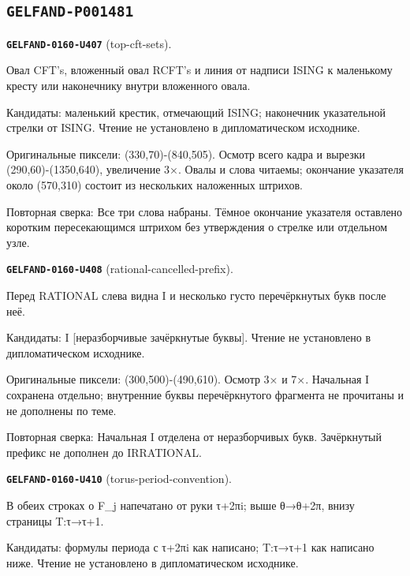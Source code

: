 \subsection*{\texttt{GELFAND-P001481}}
\par\noindent\leavevmode{}\label{GELFAND-0160-U407}\label{GELFAND-P001481:top-cft-sets}\textbf{\texttt{GELFAND-0160-U407}} (top-cft-sets).\nopagebreak[4]\par
Овал CFT's, вложенный овал RCFT's и линия от надписи ISING к маленькому кресту или наконечнику внутри вложенного овала.\par
Кандидаты: маленький крестик, отмечающий ISING; наконечник указательной стрелки от ISING. Чтение не установлено в дипломатическом исходнике.\par
Оригинальные пиксели: (330,70)-(840,505). Осмотр всего кадра и вырезки (290,60)-(1350,640), увеличение 3×. Овалы и слова читаемы; окончание указателя около (570,310) состоит из нескольких наложенных штрихов.\par
Повторная сверка: Все три слова набраны. Тёмное окончание указателя оставлено коротким пересекающимся штрихом без утверждения о стрелке или отдельном узле.\par\medskip
\par\noindent\leavevmode{}\label{GELFAND-0160-U408}\label{GELFAND-P001481:rational-cancelled-prefix}\textbf{\texttt{GELFAND-0160-U408}} (rational-cancelled-prefix).\nopagebreak[4]\par
Перед RATIONAL слева видна I и несколько густо перечёркнутых букв после неё.\par
Кандидаты: I [неразборчивые зачёркнутые буквы]. Чтение не установлено в дипломатическом исходнике.\par
Оригинальные пиксели: (300,500)-(490,610). Осмотр 3× и 7×. Начальная I сохранена отдельно; внутренние буквы перечёркнутого фрагмента не прочитаны и не дополнены по теме.\par
Повторная сверка: Начальная I отделена от неразборчивых букв. Зачёркнутый префикс не дополнен до IRRATIONAL.\par\medskip
\par\noindent\leavevmode{}\label{GELFAND-0160-U410}\label{GELFAND-P001481:torus-period-convention}\textbf{\texttt{GELFAND-0160-U410}} (torus-period-convention).\nopagebreak[4]\par
В обеих строках о F\_j напечатано от руки τ+2πi; выше θ→θ+2π, внизу страницы T:τ→τ+1.\par
Кандидаты: формулы периода с τ+2πi как написано; T:τ→τ+1 как написано ниже. Чтение не установлено в дипломатическом исходнике.\par
